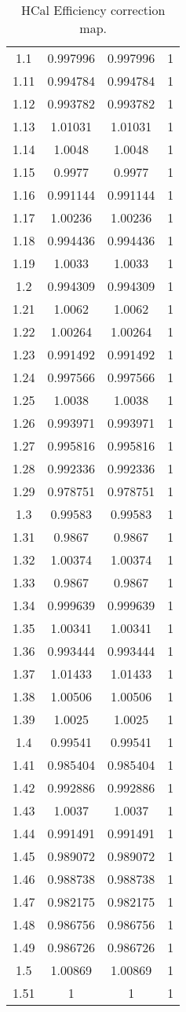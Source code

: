 \begin{table}[h!]
\begin{tabular}{|c|c|c|c|}
1.1 & 0.997996 & 0.997996 & 1 \\
1.11 & 0.994784 & 0.994784 & 1 \\
1.12 & 0.993782 & 0.993782 & 1 \\
1.13 & 1.01031 & 1.01031 & 1 \\
1.14 & 1.0048 & 1.0048 & 1 \\
1.15 & 0.9977 & 0.9977 & 1 \\
1.16 & 0.991144 & 0.991144 & 1 \\
1.17 & 1.00236 & 1.00236 & 1 \\
1.18 & 0.994436 & 0.994436 & 1 \\
1.19 & 1.0033 & 1.0033 & 1 \\
1.2 & 0.994309 & 0.994309 & 1 \\
1.21 & 1.0062 & 1.0062 & 1 \\
1.22 & 1.00264 & 1.00264 & 1 \\
1.23 & 0.991492 & 0.991492 & 1 \\
1.24 & 0.997566 & 0.997566 & 1 \\
1.25 & 1.0038 & 1.0038 & 1 \\
1.26 & 0.993971 & 0.993971 & 1 \\
1.27 & 0.995816 & 0.995816 & 1 \\
1.28 & 0.992336 & 0.992336 & 1 \\
1.29 & 0.978751 & 0.978751 & 1 \\
1.3 & 0.99583 & 0.99583 & 1 \\
1.31 & 0.9867 & 0.9867 & 1 \\
1.32 & 1.00374 & 1.00374 & 1 \\
1.33 & 0.9867 & 0.9867 & 1 \\
1.34 & 0.999639 & 0.999639 & 1 \\
1.35 & 1.00341 & 1.00341 & 1 \\
1.36 & 0.993444 & 0.993444 & 1 \\
1.37 & 1.01433 & 1.01433 & 1 \\
1.38 & 1.00506 & 1.00506 & 1 \\
1.39 & 1.0025 & 1.0025 & 1 \\
1.4 & 0.99541 & 0.99541 & 1 \\
1.41 & 0.985404 & 0.985404 & 1 \\
1.42 & 0.992886 & 0.992886 & 1 \\
1.43 & 1.0037 & 1.0037 & 1 \\
1.44 & 0.991491 & 0.991491 & 1 \\
1.45 & 0.989072 & 0.989072 & 1 \\
1.46 & 0.988738 & 0.988738 & 1 \\
1.47 & 0.982175 & 0.982175 & 1 \\
1.48 & 0.986756 & 0.986756 & 1 \\
1.49 & 0.986726 & 0.986726 & 1 \\
1.5 & 1.00869 & 1.00869 & 1 \\
1.51 & 1 & 1 & 1 \\
\hline
\end{tabular}
\caption{HCal Efficiency correction map.}
\label{tab:hcal_efficiency_correction}
\end{table}
